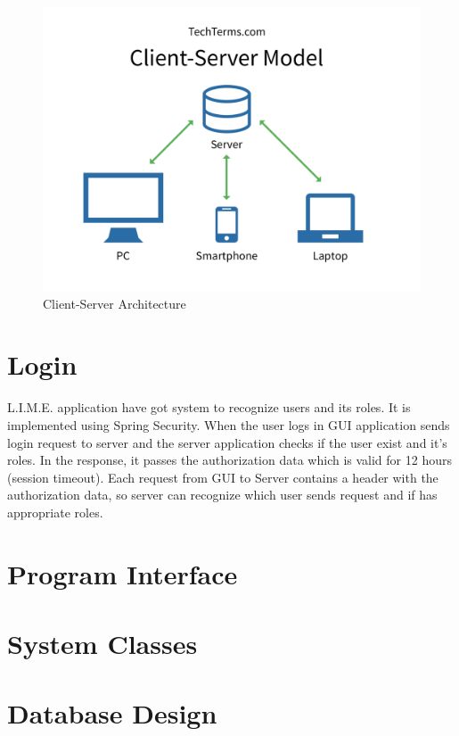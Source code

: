 \documentclass[a4paper,11pt,twoside]{report}
\theoremstyle{definition}
\begin{document}
\begin{figure}[h]

\begin{center}

\includegraphics[width=\textwidth]{CS}

\end{center}
\caption{Client-Server Architecture}
\end{figure}

\section{Login}
 L.I.M.E. application have got system to recognize users and its roles. It is implemented using Spring Security. When the user logs in GUI application sends login request to server and the server application checks if the user exist and it’s roles. In the response, it passes the authorization data which is valid for 12 hours (session timeout). Each request from GUI to Server contains a header with the authorization data, so server can recognize which user sends request and if has appropriate roles.
\section{Program Interface}


\section{System Classes}


\section{Database Design}
\end{document}
